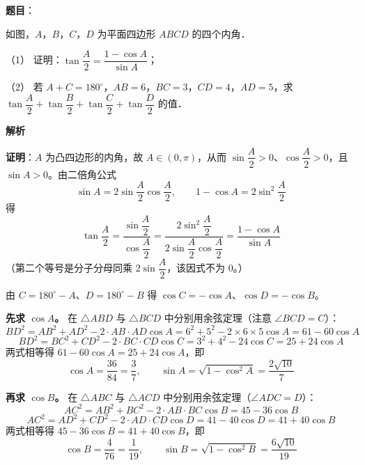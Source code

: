 \begin{answer}

\textbf{题目}：

如图，\(A\)，\(B\)，\(C\)，\(D\) 为平面四边形 \(ABCD\) 的四个内角．
\nopagebreak[4]
\begin{center}\end{center}
\nopagebreak[4]
（1） 证明：\(\tan\dfrac{A}{2}=\dfrac{1-\cos A}{\sin A}\)；

（2） 若 \(A+C=180^{\circ}\)，\(AB=6\)，\(BC=3\)，\(CD=4\)，\(AD=5\)，求 \(\tan\dfrac{A}{2}+\tan\dfrac{B}{2}+\tan\dfrac{C}{2}+\tan\dfrac{D}{2}\) 的值．

\textbf{解析}


\textbf{证明}：\(A\) 为凸四边形的内角，故 \(A\in(0,\pi)\)，从而 \(\sin\dfrac A2>0\)、\(\cos\dfrac A2>0\)，且 \(\sin A>0\)。由二倍角公式
\nopagebreak[4]
\[\sin A=2\sin\dfrac A2\cos\dfrac A2,\qquad 1-\cos A=2\sin^{2}\dfrac A2\]
得
\nopagebreak[4]
\[\tan\dfrac A2=\dfrac{\sin\dfrac A2}{\cos\dfrac A2}=\dfrac{2\sin^{2}\dfrac A2}{2\sin\dfrac A2\cos\dfrac A2}=\dfrac{1-\cos A}{\sin A}\]
（第二个等号是分子分母同乘 \(2\sin\dfrac A2\)，该因式不为 \(0\)。）


由 \(C=180^{\circ}-A\)、\(D=180^{\circ}-B\) 得 \(\cos C=-\cos A\)、\(\cos D=-\cos B\)。

\textbf{先求 \(\cos A\)。} 在 \(\triangle ABD\) 与 \(\triangle BCD\) 中分别用余弦定理（注意 \(\angle BCD=C\)）：
\nopagebreak[4]
\[BD^{2}=AB^{2}+AD^{2}-2\cdot AB\cdot AD\cos A=6^{2}+5^{2}-2\times6\times5\cos A=61-60\cos A\]
\nopagebreak[4]
\[BD^{2}=BC^{2}+CD^{2}-2\cdot BC\cdot CD\cos C=3^{2}+4^{2}-24\cos C=25+24\cos A\]
两式相等得 \(61-60\cos A=25+24\cos A\)，即
\nopagebreak[4]
\[\cos A=\dfrac{36}{84}=\dfrac37,\qquad \sin A=\sqrt{1-\cos^{2}A}=\dfrac{2\sqrt{10}}7\]

\textbf{再求 \(\cos B\)。} 在 \(\triangle ABC\) 与 \(\triangle ACD\) 中分别用余弦定理（\(\angle ADC=D\)）：
\nopagebreak[4]
\[AC^{2}=AB^{2}+BC^{2}-2\cdot AB\cdot BC\cos B=45-36\cos B\]
\nopagebreak[4]
\[AC^{2}=AD^{2}+CD^{2}-2\cdot AD\cdot CD\cos D=41-40\cos D=41+40\cos B\]
两式相等得 \(45-36\cos B=41+40\cos B\)，即
\nopagebreak[4]
\[\cos B=\dfrac{4}{76}=\dfrac1{19},\qquad \sin B=\sqrt{1-\cos^{2}B}=\dfrac{6\sqrt{10}}{19}\]


\end{answer}
